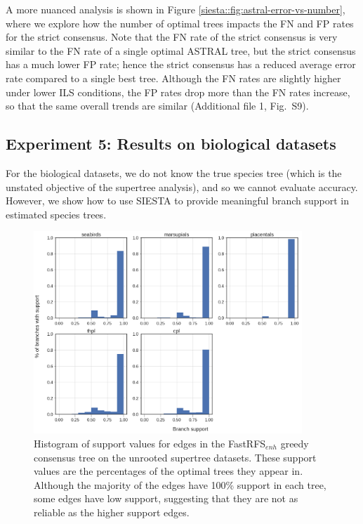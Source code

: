 A more nuanced analysis is shown in  Figure \ref{siesta::fig:astral-error-vs-number}, where we explore how
the number of optimal trees impacts the FN and FP rates for the strict consensus.
Note that the FN rate of the strict consensus is very similar to the FN rate of a single optimal ASTRAL tree, but the strict consensus has a much lower FP rate;
hence the  strict consensus has a reduced  average  error rate compared to a single best tree.
Although  the FN rates are slightly higher under lower ILS conditions, the FP rates drop more than the  FN rates increase, so that the same overall trends are  similar  (Additional file 1, Fig.~S9). %
 



\subsection{Experiment 5: Results on biological datasets}



For the biological datasets,  we do not know the true species tree (which is the unstated objective of the supertree analysis), and so we cannot evaluate accuracy. 
However, we show how to use SIESTA to provide meaningful branch support in estimated species trees.



\begin{figure}[ht]
  \centering
  \includegraphics[width=0.9\textwidth]{siesta-figs/bio_fastrfs_enh_supports.png} 
  \caption[Histogram of support values for edges in the FastRFS$_{enh}$ greedy consensus tree on the unrooted supertree datasets.]{Histogram of support values for edges in the FastRFS$_{enh}$ greedy consensus tree on the unrooted supertree datasets. These support values are
    the percentages of the optimal trees they appear in. 
    Although the majority of the edges have 100\% support in each tree, some edges have low support, suggesting that they are not as reliable as the higher support edges.}
     \label{siesta::fig:support_fastrfs}
\end{figure}

